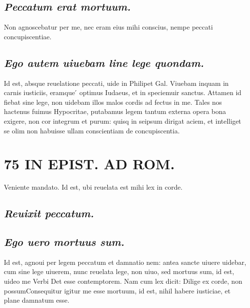 \documentclass{article}
\begin{document}
\begin{pages}
\subsection*{\textit{Peccatum erat mortuum. }}\pstart Non agnoscebatur per me, nec eram eius mihi conscius, nempe peccati concupiscentiae.   \pend
{}
{}
\subsection*{\textit{Ego autem uiuebam line lege quondam. }}\pstart Id est, absque reuelatione peccati, uide in Philipet Gal. Viuebam inquam in carnis iusticiis, eramque ́ optimus Iudaeus, et in speciemuir sanctus. Attamen id fiebat sine lege, non uidebam illos malos cordis ad fectus in me. Tales nos hactenus fuimus Hypocritae, putabamus legem tantum externa opera bona exigere, non cor integrum et purum: quisq in seipsum dirigat aciem, et intelliget se olim non habuisse ullam conscientiam de concupiscentia.   \pend
\section*{75 IN EPIST. AD ROM.  }
\marginpar{[ p.]}\pstart Veniente mandato. Id est, ubi reuelata est mihi lex in corde.   \pend
{}
{}
\subsection*{\textit{Reuixit peccatum. }}
{}
\subsection*{\textit{Ego uero mortuus sum. }}\pstart Id est, agnoui per legem peccatum et damnatio nem: antea sancte uiuere uidebar, cum sine lege uiuerem, nunc reuelata lege, non uiuo, sed mortuus sum, id est, uideo me Verbi Det esse contemptorem. Nam cum lex dicit: Dilige ex corde, non possumConsequitur igitur me esse mortuum, id est, nihil habere iusticiae, et plane damnatum esse.   \pend
{}
{}

\end{pages}
\end{document}
